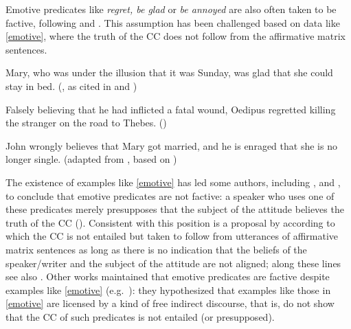 \documentclass{language}
\newcommand{\6}{\mbox{$[\hspace*{-.6mm}[$}}
\newcommand{\9}{\mbox{$]\hspace*{-.6mm}]$}}
\begin{document}




%

Emotive predicates like {\em regret, be glad} or {\em be annoyed} are also often taken to be factive, following \citealt{kiparsky-kiparsky70} and \citealt{karttunen71b}. This assumption has been challenged based on data like \ref{emotive}, where the truth of the CC does not follow from the affirmative matrix sentences. 

\begin{exe}
\ex\label{emotive}
\begin{xlist}

\ex\label{heim2} Mary, who was under the illusion that it was Sunday, was glad that she could stay in bed. (\citealt{klein1975}, as cited in \citealt[122]{gazdar79a} and \citealt[fn37]{heim92})

\ex Falsely believing that he had inflicted a fatal wound, Oedipus regretted killing the stranger on the road to Thebes. \hfill (\citealt{klein1975})

\ex John wrongly believes that Mary got married, and he is enraged that she is no longer single. \hspace*{.2cm} \hfill (adapted from \citealt{egre2008}, based on \citealt{schlenker03})

\end{xlist}
\end{exe}
The existence of examples like \ref{emotive} has led some authors, including \citet{klein1975,giannakidou1998,schlenker2003}, and \citet{egre2008}, to conclude that emotive predicates are not factive: a speaker who uses one of these predicates merely presupposes that the subject of the attitude believes the truth of the CC (\citealt{heim92}). Consistent with this position is a proposal by \citet{karttunen2016} according to which the CC is not entailed but taken to follow from utterances of affirmative matrix sentences as long as there is no indication that the beliefs of the speaker/writer and the subject of the attitude are not aligned; along these lines see also \citealt{djaerv-thesis}. %
Other works maintained that emotive predicates are factive despite examples like \ref{emotive} (e.g.\ \citealt{gazdar79a,abrusan2011,anand-hacquard2014}): they hypothesized that examples like those in \ref{emotive} are licensed by a kind of free indirect discourse, that is, do not show that the CC of such predicates is not entailed (or presupposed). 
\end{document}

